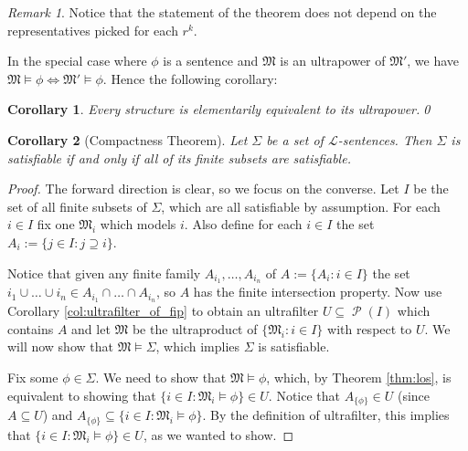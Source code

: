 \documentclass[leqno]{article}
\newtheorem{corollary}{Corollary}[theorem]
\theoremstyle{remark}
\newtheorem{remark}{Remark}[section]
\newcommand{\paren}[1]{\left( #1 \right)}
\newcommand{\set}[1]{\{#1\}}
\newcommand{\lang}{\mathcal{L}}
\newcommand{\struct}[1]{\mathfrak{#1}}
\newcommand{\powerset}[1]{\operatorname{\mathcal{P}}\paren{#1}}
\begin{document}
\begin{remark}
    Notice that the statement of the theorem does not depend on the representatives picked for each $r^k$.
\end{remark}

In the special case where $\phi$ is a sentence and $\struct{M}$ is an ultrapower of $\struct{M}'$, we have $\struct{M} \models \phi \iff \struct{M}' \models \phi$. Hence the following corollary:

\begin{corollary}
    Every structure is elementarily equivalent to its ultrapower.\qed
\end{corollary}

\begin{corollary} [Compactness Theorem]
    Let $\Sigma$ be a set of $\lang$-sentences. Then $\Sigma$ is satisfiable if and only if all of its finite subsets are satisfiable.
\end{corollary}

\begin{proof}
    The forward direction is clear, so we focus on the converse. Let $I$ be the set of all finite subsets of $\Sigma$, which are all satisfiable by assumption. For each $i \in I$ fix one $\struct{M}_i$ which models $i$. Also define for each $i \in I$ the set $A_i := \set{j \in I : j \supseteq i}$. 
    
    Notice that given any finite family $A_{i_1}, \dots, A_{i_n}$ of $A := \set{A_i : i \in I}$ the set $i_1 \cup \dots \cup i_n \in A_{i_1} \cap \dots \cap A_{i_n}$, so $A$ has the finite intersection property. Now use Corollary \ref{col:ultrafilter_of_fip} to obtain an ultrafilter $U \subseteq \powerset{I}$ which contains $A$ and let $\struct{M}$ be the ultraproduct of $\set{\struct{M}_i : i \in I}$ with respect to $U$. We will now show that $\struct{M} \models \Sigma$, which implies $\Sigma$ is satisfiable.
    
    Fix some $\phi \in \Sigma$. We need to show that $\struct{M} \models \phi$, which, by Theorem \ref{thm:los}, is equivalent to showing that $\set{i \in I : \struct{M}_i \models \phi} \in U$. Notice that $A_{\set{\phi}} \in U$ (since $A \subseteq U$) and $A_{\set{\phi}} \subseteq \set{i \in I : \struct{M}_i \models \phi}$. By the definition of ultrafilter, this implies that $\set{i \in I : \struct{M}_i \models \phi} \in U$, as we wanted to show.
\end{proof}
\end{document}
